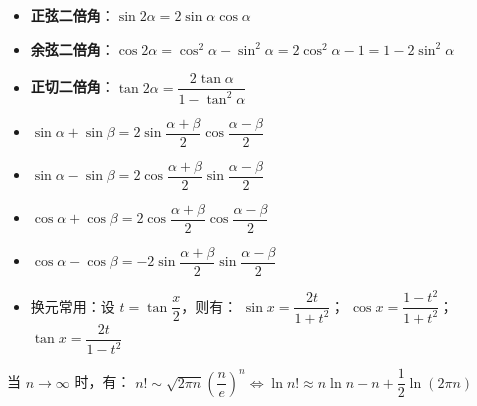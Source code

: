 \begin{itemize}
  \item {\textbf{正弦二倍角}：$\displaystyle \sin 2{\alpha} = 2 \sin {\alpha} \cos {\alpha}$

}\item {\textbf{余弦二倍角}：$\displaystyle \cos 2{\alpha} = \cos^2 {\alpha} - \sin^2 {\alpha} = 2\cos^2 {\alpha} - 1 = 1 - 2\sin^2 {\alpha}$

}\item {\textbf{正切二倍角}：$\displaystyle \tan 2{\alpha} = \dfrac{2\tan {\alpha}}{1 - \tan^2 {\alpha}}$

}
\end{itemize}

\begin{theorem}

\begin{itemize}
  \item {$\displaystyle \sin {\alpha} + \sin {\beta} = 2 \sin \dfrac{{\alpha} + {\beta}}{2} \cos \dfrac{{\alpha} - {\beta}}{2}$

}\item {$\displaystyle \sin {\alpha} - \sin {\beta} = 2 \cos \dfrac{{\alpha} + {\beta}}{2} \sin \dfrac{{\alpha} - {\beta}}{2}$

}\item {$\displaystyle \cos {\alpha} + \cos {\beta} = 2 \cos \dfrac{{\alpha} + {\beta}}{2} \cos \dfrac{{\alpha} - {\beta}}{2}$

}\item {$\displaystyle \cos {\alpha} - \cos {\beta} = -2 \sin \dfrac{{\alpha} + {\beta}}{2} \sin \dfrac{{\alpha} - {\beta}}{2}$

}
\end{itemize}

\end{theorem}

\begin{itemize}
  \item {换元常用：设 $\displaystyle t = \tan \dfrac{x}{2}$，则有： $\displaystyle \sin x = \dfrac{2t}{1 + t^2}$； $\displaystyle \cos x = \dfrac{1 - t^2}{1 + t^2}$； $\displaystyle \tan x = \dfrac{2t}{1 - t^2}$}
\end{itemize}

\begin{theorem}[Stirling 公式]

当 $\displaystyle n \to \infty$ 时，有： $\displaystyle n! \sim \sqrt{2\pi n} \left( \dfrac{n}{e} \right)^n\iff \displaystyle \ln n! \approx n \ln n - n + \dfrac{1}{2} \ln (2\pi n)$

\end{theorem}

